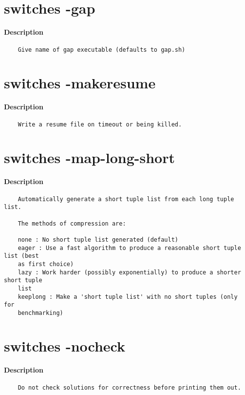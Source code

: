 \section{switches -gap}
\paragraph{Description}
{\footnotesize
\begin{verbatim}
    Give name of gap executable (defaults to gap.sh)
\end{verbatim}
}
\section{switches -makeresume}
\paragraph{Description}
{\footnotesize
\begin{verbatim}
    Write a resume file on timeout or being killed.
\end{verbatim}
}
\section{switches -map-long-short}
\paragraph{Description}
{\footnotesize
\begin{verbatim}
    Automatically generate a short tuple list from each long tuple list.

    The methods of compression are:

    none : No short tuple list generated (default)
    eager : Use a fast algorithm to produce a reasonable short tuple list (best
    as first choice)
    lazy : Work harder (possibly exponentially) to produce a shorter short tuple
    list
    keeplong : Make a 'short tuple list' with no short tuples (only for
    benchmarking)
\end{verbatim}
}
\section{switches -nocheck}
\paragraph{Description}
{\footnotesize
\begin{verbatim}
    Do not check solutions for correctness before printing them out.
\end{verbatim}
}

